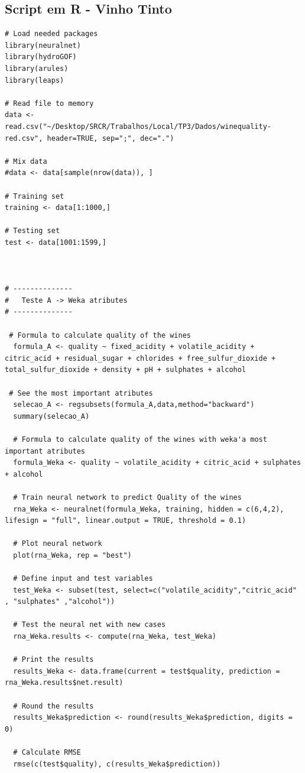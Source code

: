 \documentclass{report}
\begin{document}
\subsection{Script em R - Vinho Tinto}
\begin{verbatim}
# Load needed packages
library(neuralnet)
library(hydroGOF)
library(arules)
library(leaps)

# Read file to memory
data <- read.csv("~/Desktop/SRCR/Trabalhos/Local/TP3/Dados/winequality-red.csv", header=TRUE, sep=";", dec=".")

# Mix data
#data <- data[sample(nrow(data)), ]

# Training set
training <- data[1:1000,]

# Testing set
test <- data[1001:1599,]



# --------------
#	Teste A	-> Weka atributes	
# --------------

 # Formula to calculate quality of the wines 
  formula_A <- quality ~ fixed_acidity + volatile_acidity + citric_acid + residual_sugar + chlorides + free_sulfur_dioxide + total_sulfur_dioxide + density + pH + sulphates + alcohol
 
 # See the most important atributes
  selecao_A <- regsubsets(formula_A,data,method="backward")
  summary(selecao_A)
  
  # Formula to calculate quality of the wines with weka'a most important atributes
  formula_Weka <- quality ~ volatile_acidity + citric_acid + sulphates + alcohol
  
  # Train neural network to predict Quality of the wines
  rna_Weka <- neuralnet(formula_Weka, training, hidden = c(6,4,2), lifesign = "full", linear.output = TRUE, threshold = 0.1)
  
  # Plot neural network
  plot(rna_Weka, rep = "best")
  
  # Define input and test variables
  test_Weka <- subset(test, select=c("volatile_acidity","citric_acid" , "sulphates" ,"alcohol"))
  
  # Test the neural net with new cases
  rna_Weka.results <- compute(rna_Weka, test_Weka)
  
  # Print the results
  results_Weka <- data.frame(current = test$quality, prediction = rna_Weka.results$net.result)
  
  # Round the results
  results_Weka$prediction <- round(results_Weka$prediction, digits = 0)
  
  # Calculate RMSE
  rmse(c(test$quality), c(results_Weka$prediction))
  

\end{verbatim}
\end{document}
